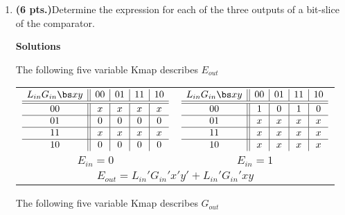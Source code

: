 \begin{enumerate}
\begin{enumerate}
\end{enumerate}

\item \textbf{ (6 pts.)}Determine the \SOPmin expression for each of the 
three outputs of a bit-slice of the comparator.

	\begin{onlysolution} \textbf{Solutions} \itshape{
	The following five variable Kmap describes $E_{out}$

\begin{tabular}{cc}
$\begin{array} {c||c|c|c|c}
 L_{in} G_{in}  \bs x  y & 00 & 01 & 11 & 10 \\ \hline \hline
       		00       & x  & x  & x  &  x \\ \hline
       		01       & 0  & 0  & 0  &  0 \\ \hline
       		11       & x  & x  & x  &  x \\ \hline
       		10       & 0  & 0  & 0  &  0 \\
\end{array}$ 
&
$\begin{array} {c||c|c|c|c}
 L_{in} G_{in}  \bs x  y & 00 & 01 & 11 & 10 \\ \hline \hline
       		00       & 1  & 0  & 1  & 0  \\ \hline
       		01       & x  & x  & x  & x  \\ \hline
       		11       & x  & x  & x  & x  \\ \hline
       		10       & x  & x  & x  & x  \\
\end{array}$  \\
$E_{in}=0$ & $E_{in}=1$ \\
\multicolumn{2}{c}{$E_{out} = L_{in}'G_{in}'x'y' + L_{in}'G_{in}'xy $} \\
\end{tabular}

The following five variable Kmap describes $G_{out}$

}
\end{onlysolution}
\end{enumerate}
